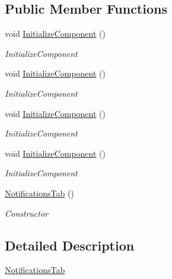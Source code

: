 \subsection*{Public Member Functions}
\begin{DoxyCompactItemize}
\item 
void \hyperlink{class_baudi_1_1_client_1_1_view_1_1_tabs_1_1_notifications_tab_a0975aef50fd5a30c5882d1d3e917c25f}{Initialize\+Component} ()
\begin{DoxyCompactList}\small\item\em Initialize\+Component \end{DoxyCompactList}\item 
void \hyperlink{class_baudi_1_1_client_1_1_view_1_1_tabs_1_1_notifications_tab_a0975aef50fd5a30c5882d1d3e917c25f}{Initialize\+Component} ()
\begin{DoxyCompactList}\small\item\em Initialize\+Component \end{DoxyCompactList}\item 
void \hyperlink{class_baudi_1_1_client_1_1_view_1_1_tabs_1_1_notifications_tab_a0975aef50fd5a30c5882d1d3e917c25f}{Initialize\+Component} ()
\begin{DoxyCompactList}\small\item\em Initialize\+Component \end{DoxyCompactList}\item 
void \hyperlink{class_baudi_1_1_client_1_1_view_1_1_tabs_1_1_notifications_tab_a0975aef50fd5a30c5882d1d3e917c25f}{Initialize\+Component} ()
\begin{DoxyCompactList}\small\item\em Initialize\+Component \end{DoxyCompactList}\item 
\hyperlink{class_baudi_1_1_client_1_1_view_1_1_tabs_1_1_notifications_tab_ac75e2bace7848c2aa12415a05af9867d}{Notifications\+Tab} ()
\begin{DoxyCompactList}\small\item\em Constructor \end{DoxyCompactList}\end{DoxyCompactItemize}


\subsection{Detailed Description}
\hyperlink{class_baudi_1_1_client_1_1_view_1_1_tabs_1_1_notifications_tab}{Notifications\+Tab} 

